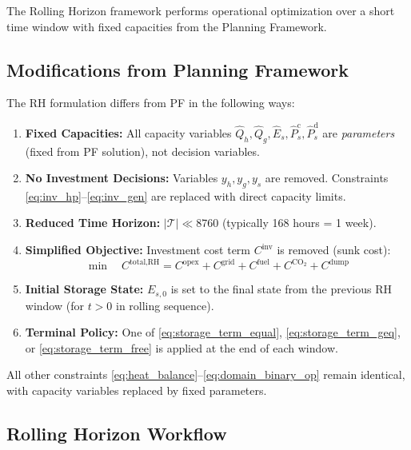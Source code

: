 \documentclass[11pt]{article}
\begin{document}
The Rolling Horizon framework performs operational optimization over a short time window with fixed capacities from the Planning Framework.

\subsection{Modifications from Planning Framework}

The RH formulation differs from PF in the following ways:

\begin{enumerate}
\item \textbf{Fixed Capacities:} All capacity variables $\hat{Q}_h, \hat{Q}_g, \hat{E}_s, \hat{P}_s^{\text{c}}, \hat{P}_s^{\text{d}}$ are \textit{parameters} (fixed from PF solution), not decision variables.

\item \textbf{No Investment Decisions:} Variables $y_h, y_g, y_s$ are removed. Constraints \eqref{eq:inv_hp}--\eqref{eq:inv_gen} are replaced with direct capacity limits.

\item \textbf{Reduced Time Horizon:} $|\mathcal{T}| \ll 8760$ (typically 168 hours = 1 week).

\item \textbf{Simplified Objective:} Investment cost term $C^{\text{inv}}$ is removed (sunk cost):
\begin{equation}
\min \quad C^{\text{total,RH}} = C^{\text{opex}} + C^{\text{grid}} + C^{\text{fuel}} + C^{\text{CO}_2} + C^{\text{dump}}
\label{eq:obj_rh}
\end{equation}

\item \textbf{Initial Storage State:} $E_{s,0}$ is set to the final state from the previous RH window (for $t > 0$ in rolling sequence).

\item \textbf{Terminal Policy:} One of \eqref{eq:storage_term_equal}, \eqref{eq:storage_term_geq}, or \eqref{eq:storage_term_free} is applied at the end of each window.
\end{enumerate}

All other constraints \eqref{eq:heat_balance}--\eqref{eq:domain_binary_op} remain identical, with capacity variables replaced by fixed parameters.

\subsection{Rolling Horizon Workflow}
\end{document}
